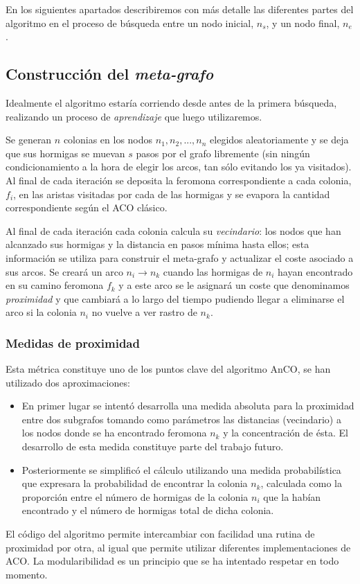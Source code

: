 \documentclass{llncs}
\begin{document}
En los siguientes apartados describiremos con más detalle las diferentes partes del algoritmo en el proceso de búsqueda entre un nodo inicial, $n_s$, y un nodo final, $n_e$.

\subsection{Construcción del \textit{meta-grafo}}
Idealmente el algoritmo estaría corriendo desde antes de la primera búsqueda, realizando un proceso de \textit{aprendizaje} que luego utilizaremos.

Se generan $n$ colonias en los nodos $n_1, n_2,..., n_n$ elegidos aleatoriamente y se deja que sus hormigas se muevan $s$ pasos por el grafo libremente (sin ningún condicionamiento a la hora de elegir los arcos, tan sólo evitando los ya visitados).
Al final de cada iteración se deposita la feromona correspondiente a cada colonia, $f_i$, en las aristas visitadas por cada de las hormigas y se evapora la cantidad correspondiente según el ACO clásico.

Al final de cada iteración cada colonia calcula su \textit{vecindario}: los nodos que han alcanzado sus hormigas y la distancia en pasos mínima hasta ellos; esta información se utiliza para construir el meta-grafo y actualizar el coste asociado a sus arcos.
Se creará un arco $n_i \rightarrow n_k$ cuando las hormigas de $n_i$ hayan encontrado en su camino feromona $f_k$ y a este arco se le asignará un coste que denominamos \textit{proximidad} y que cambiará a lo largo del tiempo pudiendo llegar a eliminarse el arco si la colonia $n_i$ no vuelve a ver rastro de $n_k$.

\subsubsection{Medidas de proximidad}
Esta métrica constituye uno de los puntos clave del algoritmo AnCO, se han utilizado dos aproximaciones:
\begin{itemize}
  \item En primer lugar se intentó desarrolla una medida absoluta para la proximidad entre dos subgrafos tomando como parámetros las distancias (vecindario) a los nodos donde se ha encontrado feromona $n_k$ y la concentración de ésta. El desarrollo de esta medida constituye parte del trabajo futuro.
  \item Posteriormente se simplificó el cálculo utilizando una medida probabilística que expresara la probabilidad de encontrar la colonia $n_k$, calculada como la proporción entre el número de hormigas de la colonia $n_i$ que la habían encontrado y el número de hormigas total de dicha colonia.
\end{itemize}
El código del algoritmo permite intercambiar con facilidad una rutina de proximidad por otra, al igual que permite utilizar diferentes implementaciones de ACO.
La modularibilidad es un principio que se ha intentado respetar en todo momento.
\end{document}
